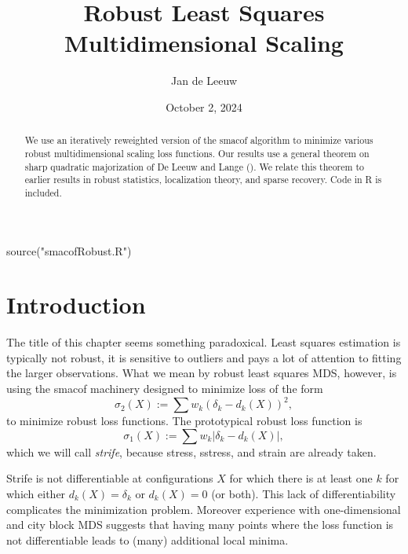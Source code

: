 \documentclass[
  12pt,
  letterpaper,
  DIV=11,
  numbers=noendperiod]{scrartcl}
\title{Robust Least Squares Multidimensional Scaling}
\author{Jan de Leeuw}
\date{October 2, 2024}
\newenvironment{Shaded}{\begin{snugshade}}{\end{snugshade}}
\newcommand{\FunctionTok}[1]{\textcolor[rgb]{0.28,0.35,0.67}{#1}}
\newcommand{\NormalTok}[1]{\textcolor[rgb]{0.00,0.23,0.31}{#1}}
\newcommand{\StringTok}[1]{\textcolor[rgb]{0.13,0.47,0.30}{#1}}
\newcommand{\sectionbreak}{\pagebreak}
\begin{document}
\maketitle
\begin{abstract}
We use an iteratively reweighted version of the smacof algorithm to
minimize various robust multidimensional scaling loss functions. Our
results use a general theorem on sharp quadratic majorization of De
Leeuw and Lange (). We relate
this theorem to earlier results in robust statistics, localization
theory, and sparse recovery. Code in R is included.
\end{abstract}


\sectionbreak

\begin{Shaded}
\begin{Highlighting}[]
\FunctionTok{source}\NormalTok{(}\StringTok{"smacofRobust.R"}\NormalTok{)}
\end{Highlighting}
\end{Shaded}

\section{Introduction}\label{introduction}

The title of this chapter seems something paradoxical. Least squares
estimation is typically not robust, it is sensitive to outliers and pays
a lot of attention to fitting the larger observations. What we mean by
robust least squares MDS, however, is using the smacof machinery
designed to minimize loss of the form \begin{equation}
\sigma_2(X):=\sum w_k(\delta_k-d_k(X))^2\label{eq:stressdef},
\end{equation} to minimize robust loss functions. The prototypical
robust loss function is \begin{equation}
\sigma_1(X):=\sum w_k|\delta_k-d_k(X)|\label{eq:stradddef},
\end{equation} which we will call \emph{strife}, because stress,
sstress, and strain are already taken.

Strife is not differentiable at configurations \(X\) for which there is
at least one \(k\) for which either \(d_k(X)=\delta_k\) or \(d_k(X)=0\)
(or both). This lack of differentiability complicates the minimization
problem. Moreover experience with one-dimensional and city block MDS
suggests that having many points where the loss function is not
differentiable leads to (many) additional local minima.
\end{document}
